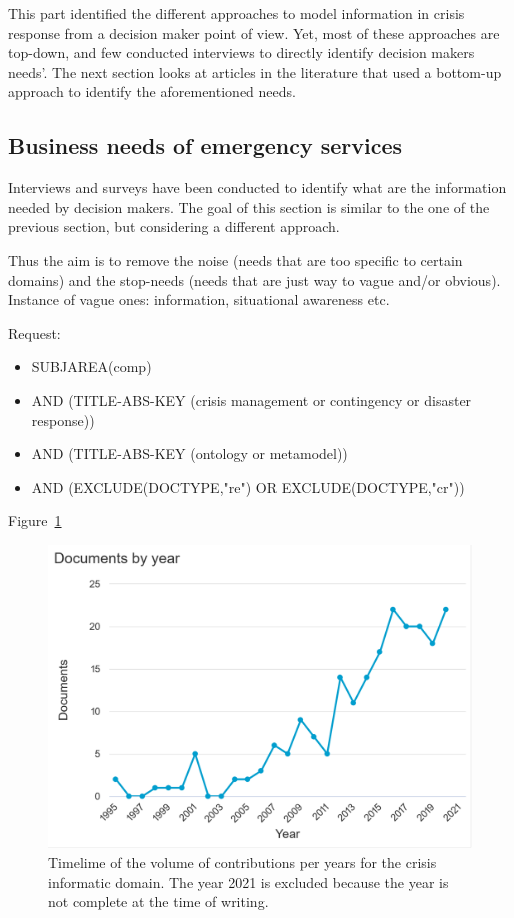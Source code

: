 This part identified the different approaches to model information in crisis response from a decision maker point of view.
Yet, most of these approaches are top-down, and few conducted interviews to directly identify decision makers needs'.
The next section looks at articles in the literature that used a bottom-up approach to identify the aforementioned needs.

\subsection{Business needs of emergency services}
Interviews and surveys have been conducted to identify what are the information needed by decision makers.
The goal of this section is similar to the one of the previous section, but considering a different approach.

Thus the aim is to remove the noise (needs that are too specific to certain domains) and the stop-needs (needs that are just way to vague and/or obvious).
Instance of vague ones: information, situational awareness etc.

Request:
\begin{itemize}
    \item SUBJAREA(comp)
    \item AND (TITLE-ABS-KEY ({crisis management} or contingency or {disaster response}))
    \item AND (TITLE-ABS-KEY (ontology or metamodel))
    \item AND (EXCLUDE(DOCTYPE,"re") OR EXCLUDE(DOCTYPE,"cr"))
\end{itemize}

Figure~\ref{literature:business-needs-hist}

\begin{figure}[bp]
    \centering
    \includegraphics[width=\textwidth]{figures/chap-2/business-needs-hist.pdf}
    \caption{Timelime of the volume of contributions per years for the crisis informatic domain. The year 2021 is excluded because the year is not complete at the time of writing.}
    \label{literature:business-needs-hist}
\end{figure}

